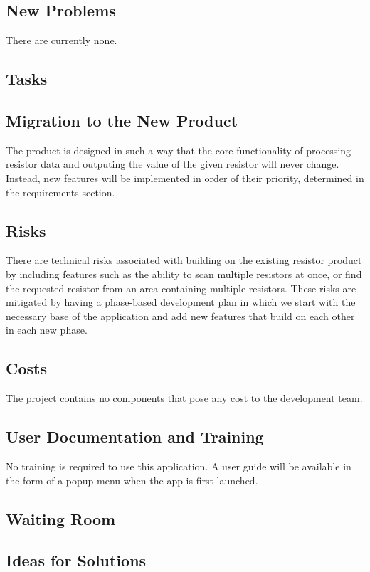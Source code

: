 \documentclass{article}
\begin{document}
\subsection{New Problems}
There are currently none.

\subsection{Tasks}
\subsection{Migration to the New Product}
The product is designed in such a way that the core functionality of processing resistor data and outputing the value of the given resistor will never change. Instead, new features will be implemented in order of their priority, determined in the requirements section.

\subsection{Risks}
There are technical risks associated with building on the existing resistor product by including features such as the ability to scan multiple resistors at once, or find the requested resistor from an area containing multiple resistors. These risks are mitigated by having a phase-based development plan in which we start with the necessary base of the application and add new features that build on each other in each new phase.

\subsection{Costs}
The project contains no components that pose any cost to the development team.

\subsection{User Documentation and Training}
No training is required to use this application. A user guide will be available in the form of a popup menu when the app is first launched.

\subsection{Waiting Room}


\subsection{Ideas for Solutions}
\end{document}
